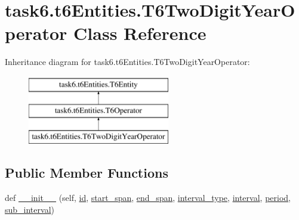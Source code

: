 \hypertarget{classtask6_1_1t6Entities_1_1T6TwoDigitYearOperator}{}\section{task6.\+t6\+Entities.\+T6\+Two\+Digit\+Year\+Operator Class Reference}
\label{classtask6_1_1t6Entities_1_1T6TwoDigitYearOperator}
Inheritance diagram for task6.\+t6\+Entities.\+T6\+Two\+Digit\+Year\+Operator\+:\begin{figure}[H]
\begin{center}
\leavevmode
\includegraphics[height=3.000000cm]{classtask6_1_1t6Entities_1_1T6TwoDigitYearOperator}
\end{center}
\end{figure}
\subsection*{Public Member Functions}
\begin{DoxyCompactItemize}
\item 
def \hyperlink{classtask6_1_1t6Entities_1_1T6TwoDigitYearOperator_af6730d8b56d1c70a8a65798b6eb10ce0}{\+\_\+\+\_\+init\+\_\+\+\_\+} (self, \hyperlink{classtask6_1_1t6Entities_1_1T6Entity_afeeced8134bb3ebe0cfecc64d0ab46a4}{id}, \hyperlink{classtask6_1_1t6Entities_1_1T6Entity_a52779e9af8864dc98e8b02fc5b9b041a}{start\+\_\+span}, \hyperlink{classtask6_1_1t6Entities_1_1T6Entity_aeb402200b156cd9562c5111dfe777b98}{end\+\_\+span}, \hyperlink{classtask6_1_1t6Entities_1_1T6TwoDigitYearOperator_a4942dc925e5400f3877d10b184f83321}{interval\+\_\+type}, \hyperlink{classtask6_1_1t6Entities_1_1T6TwoDigitYearOperator_a12bcb3df12dbc55a9798b07d533ff9a2}{interval}, \hyperlink{classtask6_1_1t6Entities_1_1T6TwoDigitYearOperator_ab90e3c1d93213f9719a59f5806ddf6df}{period}, \hyperlink{classtask6_1_1t6Entities_1_1T6TwoDigitYearOperator_a324e05be351f629bd65001d558ba168c}{sub\+\_\+interval})
\end{DoxyCompactItemize}
